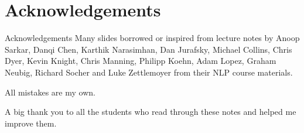 
\section*{Acknowledgements}

\begin{frame}
\centering
\begin{alertblock}{Acknowledgements}
Many slides borrowed or inspired from lecture notes by Anoop Sarkar, Danqi Chen, Karthik Narasimhan, Dan Jurafsky, Michael Collins, Chris Dyer, Kevin Knight, Chris Manning, Philipp Koehn, Adam Lopez, Graham Neubig, Richard Socher and Luke Zettlemoyer from their NLP course materials. 

\bigskip

All mistakes are my own.

\bigskip

A big thank you to all the students who read through these notes and helped me improve them.

\end{alertblock}
\end{frame}

